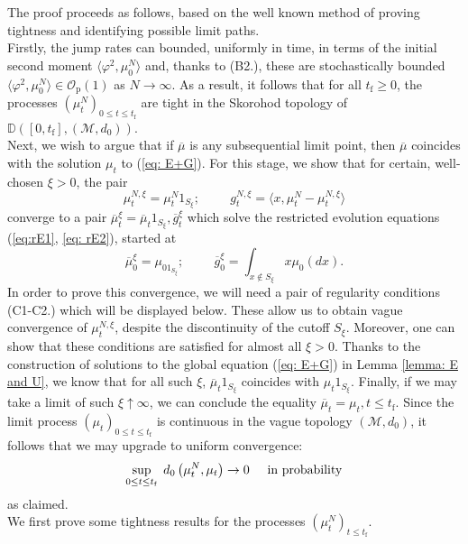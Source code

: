 \documentclass[11pt, notitlepage]{article}
\begin{document}
The proof proceeds as follows, based on the well known method of proving tightness and identifying possible limit paths. \medskip \\  Firstly, the jump rates can bounded, uniformly in time, in terms of the initial second moment $\langle \varphi^2, \mu^N_0\rangle$ and, thanks to (B2.), these are stochastically bounded $\langle \varphi^2, \mu^N_0\rangle \in \mathcal{O}_\mathrm{p}(1)$ as $N\rightarrow \infty$. As a result, it follows that for all  $t_\mathrm{f}\ge 0$, the processes $(\mu^N_t)_{0\le t\le t_\mathrm{f}}$ are tight in the Skorohod topology of $\mathbb{D}([0,t_\mathrm{f}],(\mathcal{M},d_0))$.  \medskip \\ Next, we wish to argue that if $\overline{\mu}$ is any subsequential limit point, then $\overline{\mu}$ coincides with the solution $\mu_t$ to (\ref{eq: E+G}). For this stage, we show that for certain, well-chosen $\xi>0$, the pair \begin{equation} \mu^{N,\xi}_t=\mu^N_t1_{S_\xi}; \hspace{1cm} g^{N,\xi}_t=\langle x, \mu^N_t-\mu^{N,\xi}_t\rangle  \end{equation} converge to a pair $\overline{\mu}^\xi_t=\overline{\mu}_t1_{S_\xi}, \overline{g}^\xi_t$ which solve the restricted evolution equations (\ref{eq:rE1},  \ref{eq: rE2}), started at \begin{equation} \overline{\mu}^\xi_0=\mu_01_{S_\xi}; \hspace{1cm} \overline{g}^\xi_0=\int_{x\not \in S_\xi} x\mu_0(dx). \end{equation} In order to prove this convergence, we will need a pair of regularity conditions (C1-C2.) which will be displayed below. These allow us to obtain vague convergence of $\mu^{N,\xi}_t$, despite the discontinuity of the cutoff $S_\xi.$ Moreover, one can show that these conditions are satisfied for almost all $\xi>0$.  Thanks to the construction of solutions to the global equation (\ref{eq: E+G}) in Lemma \ref{lemma: E and U}, we know that for all such $\xi$, $\overline{\mu}_t1_{S_\xi}$ coincides with $\mu_t1_{S_\xi}$. Finally, if we may take a limit of such $\xi \uparrow \infty$, we can conclude the equality $\overline{\mu}_t=\mu_t, t\le t_\mathrm{f}$.  Since the limit process $(\mu_t)_{0\le t\le t_\mathrm{f}}$ is continuous in the vague topology $(\mathcal{M},d_0)$, it follows that we may upgrade to uniform convergence: \begin{equation} \sup_{0\le t\le t_\mathrm{f}}\hspace{0.1cm}d_0\left(\mu^N_t, \mu_t\right) \rightarrow 0 \hspace{0.5cm} \text{in probability}  \end{equation} as claimed. \medskip \\ We first prove some tightness results for the processes $(\mu^N_t)_{t\le t_\mathrm{f}}.$ 
\end{document}
